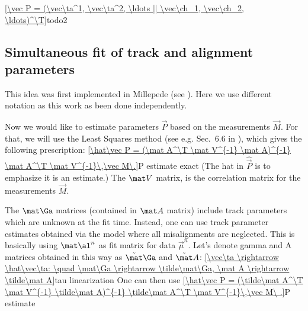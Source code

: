 \eqref{\vec P = (\vec\ta^1, \vec\ta^2, \ldots || \vec\ch_1, \vec\ch_2, \ldots)^\T}{todo2}



\subsection[al sim fit]{Simultaneous fit of track and alignment parameters}

This idea was first implemented in Millepede (see ). Here we use different notation as this work as been done independently.

Now we would like to estimate parameters $\vec P$ based on the measurements $\vec M$. For that, we will use the Least Squares method (see e.g. Sec.~6.6 in ), which gives the following prescription:
\eqref{\hat\vec P = (\mat A^\T \mat V^{-1} \mat A)^{-1} \mat A^\T \mat V^{-1}\,\vec M\.}{P estimate exact}
(The hat in $\hat\vec P$ is to emphasize it is an estimate.) The $\mat V$ matrix, is the correlation matrix for the measurements $\vec M$.

The $\mat\Ga$ matrices (contained in $\mat A$ matrix) include track parameters which are unknown at the fit time. Instead, one can use track parameter estimates obtained via the model where all misalignments are neglected. This is basically using $\mat \al^n$ as fit matrix for data $\vec \mu^n$. Let's denote gamma and A matrices obtained in this way as $\tilde\mat\Ga$ and $\tilde\mat A$:
\eqref{\vec\ta \rightarrow \hat\vec\ta: \quad \mat\Ga \rightarrow \tilde\mat\Ga, \mat A \rightarrow \tilde\mat A}{tau linearization}
 One can then use
\eqref{\hat\vec P = (\tilde\mat A^\T \mat V^{-1} \tilde\mat A)^{-1} \tilde\mat A^\T \mat V^{-1}\,\vec M\ .}{P estimate}


